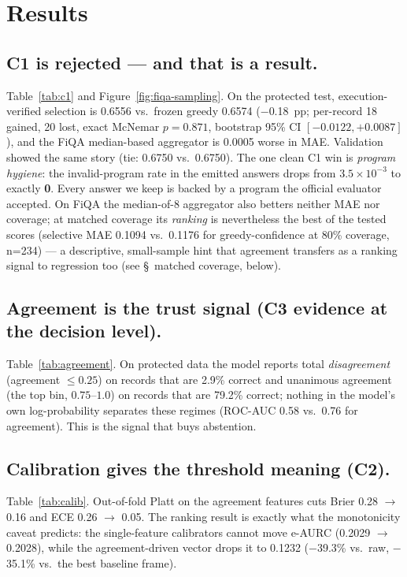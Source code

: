 \documentclass[conference]{IEEEtran}
\begin{document}
\section{Results}\label{sec:results}
\subsection{C1 is rejected --- and that is a result.}
Table~\ref{tab:c1} and Figure~\ref{fig:fiqa-sampling}. On the protected test, execution-verified selection is 0.6556 vs.\
frozen greedy 0.6574 ($-$0.18~pp; per-record 18 gained, 20 lost, exact McNemar $p=0.871$,
bootstrap 95\% CI $[-0.0122,+0.0087]$), and the FiQA median-based
aggregator is 0.0005 worse in MAE. Validation showed the same story (tie: 0.6750 vs.\ 0.6750).
The one clean C1 win is \emph{program hygiene}: the invalid-program rate in the emitted
answers drops from $3.5\times10^{-3}$ to exactly \textbf{0}. Every answer we keep is backed
by a program the official evaluator accepted. On FiQA the median-of-8 aggregator also
betters neither MAE nor coverage; at matched coverage its \emph{ranking} is nevertheless the
best of the tested scores (selective MAE 0.1094 vs.\ 0.1176 for greedy-confidence at 80\%
coverage, n=234) --- a descriptive, small-sample hint that agreement transfers as a ranking
signal to regression too (see \S~matched coverage, below).

\subsection{Agreement is the trust signal (C3 evidence at the decision level).}
Table~\ref{tab:agreement}. On protected data the model reports total
\emph{disagreement} (agreement $\le 0.25$) on records that are 2.9\% correct and unanimous
agreement (the top bin, $0.75$--$1.0$) on records that are 79.2\% correct; nothing in the
model's own log-probability separates these regimes (ROC-AUC 0.58 vs.\ 0.76 for agreement).
This is the signal that buys abstention.

\subsection{Calibration gives the threshold meaning (C2).}
Table~\ref{tab:calib}. Out-of-fold Platt on the agreement features cuts Brier 0.28
$\rightarrow$ 0.16 and ECE 0.26 $\rightarrow$ 0.05. The ranking result is exactly what the
monotonicity caveat predicts: the single-feature calibrators cannot move e-AURC
(0.2029 $\rightarrow$ 0.2028), while the agreement-driven vector drops it to 0.1232
($-$39.3\% vs.\ raw, $-$35.1\% vs.\ the best baseline frame).
\end{document}

